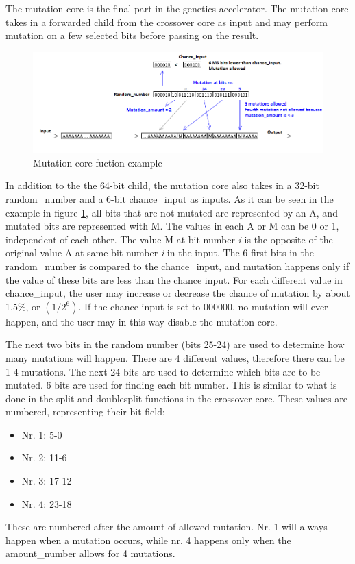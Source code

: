 The mutation core is the final part in the genetics accelerator. The mutation core takes in a forwarded child from the crossover core as input and may perform mutation on a few selected bits before passing on the result. 

\begin{figure}[H]
\includegraphics[width=\textwidth]{fpga/fig/mutation.png}
\caption{Mutation core fuction example}
\label{Fig_Mutation}
\end{figure}

In addition to the the 64-bit child, the mutation core also takes in a 32-bit random\_number and a 6-bit chance\_input as inputs. As it can be seen in the example in figure \ref{Fig_Mutation}, all bits that are not mutated are represented by an A, and mutated bits are represented with M. The values in each A or M can be 0 or 1, independent of each other. The value M at bit number \emph{i} is the opposite of the original value A at same bit number \emph{i} in the input.
The 6 first bits in the random\_number is compared to the chance\_input, and mutation happens only if the value of these bits are less than the chance input. For each different value in chance\_input, the user may increase or decrease the chance of mutation by about 1,5\%, or $(1 / 2^6)$. If the chance input is set to 000000, no mutation will ever happen, and the user may in this way disable the mutation core.

The next two bits in the random number (bits 25-24) are used to determine how many mutations will happen. There are 4 different values, therefore there can be 1-4 mutations.
The next 24 bits are used to determine which bits are to be mutated. 6 bits are used for finding each bit number. This is similar to what is done in the split and doublesplit functions in the crossover core. These values are numbered, representing their bit field:
\begin{itemize}
\item Nr. 1: 5-0
\item Nr. 2: 11-6
\item Nr. 3: 17-12
\item Nr. 4: 23-18
\end{itemize}
These are numbered after the amount of allowed mutation. Nr. 1 will always happen when a mutation occurs, while nr. 4 happens only when the amount\_number allows for 4 mutations.

